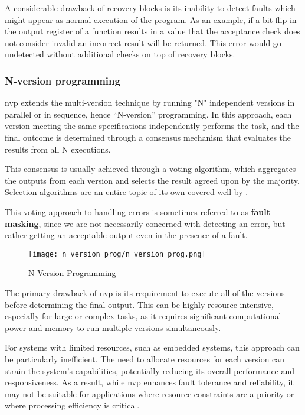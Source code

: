 A considerable drawback of recovery blocks is its inability to detect faults which might appear as normal execution of the program. As an example, if a bit-flip in the output register of a function results in a value that the acceptance check does not consider invalid an incorrect result will be returned. This error would go undetected without additional checks on top of recovery blocks.

\subsubsection{N-version programming}

\Acrfull{nvp} \cite{aa:nvp} extends the multi-version technique by running "N" independent versions in parallel or in sequence, hence “N-version” programming. In this approach, each version meeting the same specifications independently performs the task, and the final outcome is determined through a consensus mechanism that evaluates the results from all N executions.

This consensus is usually achieved through a voting algorithm, which aggregates the outputs from each version and selects the result agreed upon by the majority. Selection algorithms are an entire topic of its own covered well by \cite{Aljarbouh_2021}.

This voting approach to handling errors is sometimes referred to as \textbf{fault masking}, since we are not necessarily concerned with detecting an error, but rather getting an acceptable output even in the presence of a fault.

\begin{figure}[hbt!]
    \centering
    \texttt{[image: n\_version\_prog/n\_version\_prog.png]}
    \caption{N-Version Programming}
\end{figure}

The primary drawback of \acrshort{nvp} is its requirement to execute all of the versions before determining the final output. This can be highly resource-intensive, especially for large or complex tasks, as it requires significant computational power and memory to run multiple versions simultaneously.

For systems with limited resources, such as embedded systems, this approach can be particularly inefficient. The need to allocate resources for each version can strain the system's capabilities, potentially reducing its overall performance and responsiveness. As a result, while \acrshort{nvp} enhances fault tolerance and reliability, it may not be suitable for applications where resource constraints are a priority or where processing efficiency is critical.

